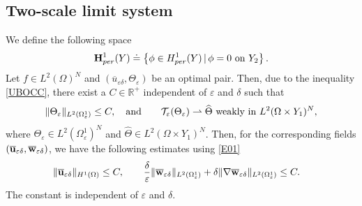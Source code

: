 \documentclass[11pt,a4paper]{article}
\numberwithin{equation}{section}
\def\wo{\overline}
\def\O{\Omega}
\def\d{\delta}
\def\e{\varepsilon}
\def\Te{{\cal T}_\varepsilon}
\def\R{{\mathbb{R}}}
\def\R{{\mathbb{R}}}
\def\ed{{\varepsilon\delta}}
\def\wh{\widehat }
\def\X{\times }
\def\Gu{{\bf u}}
\def\Gw{{\bf w}}
\def\GH{{\bf H}}
\begin{document}
\subsection{Two-scale limit system}
We define the following space
$$ \GH^1_{per}(Y)\doteq\left\{\phi\in H^1_{per}(Y)\,|\, \phi=0\text{ on $Y_2$}\right\}.$$
Let $f\in L^2(\O)^N$ and $(\wo u_\ed,\Theta_\e)$ be an optimal pair. Then, due to the inequality \eqref{UBOCC}, there exist a $C\in\R^+$ independent of $\e$ and $\d$ such that
\begin{equation}\label{OCC01}
	\|\Theta_\e\|_{L^2(\O^1_\e)}\leq C,\quad \text{and}\quad \quad \Te(\Theta_\e) \rightharpoonup \wh \Theta \text{ weakly in }L^2(\Omega\times Y_1)^N,  
\end{equation}
where $\Theta_\e\in L^2(\O^1_\e)^N$ and $\wh\Theta\in L^2(\Omega\times Y_1)^N$.  
Then, for the corresponding fields $(\wo\Gu_\ed,\wo\Gw_\ed)$, we have the following estimates using \eqref{E01}
\begin{equation}\label{EM01}
	\begin{aligned}
		\|\wo\Gu_\ed\|_{H^1(\O)}&\leq C,\qquad {\d\over \e}\|\wo\Gw_\ed\|_{L^2(\O^1_\e)}+\d\|\nabla \wo\Gw_\ed\|_{L^2(\O^1_\e)}\leq C.
	\end{aligned}
\end{equation}
The constant is independent of $\e$ and $\d$.
\end{document}
